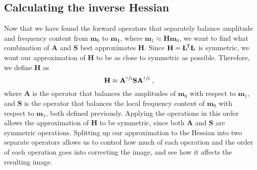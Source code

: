     \subsection{Calculating the inverse Hessian}
    Now that we have found the forward operators that separately balance amplitude and frequency content from $\mathbf{m}_0$ to $\mathbf{m_1}$, where $\mathbf{m}_1 \approx \mathbf{H} \mathbf{m}_0$, we want to find what combination of $\mathbf{A}$ and $\mathbf{S}$ best approximates $\mathbf{H}$.
    Since $\mathbf{H} = \mathbf{L}^{\mkern-1.5mu\mathsf{T}}\mathbf{L}$ is symmetric, we want our approximation of $\mathbf{H}$ to be as close to symmetric as possible.
    Therefore, we define $\mathbf{H}$ as
    \begin{equation}
            \mathbf{H} \approx \mathbf{A}^{\sfrac{1}{2}}\mathbf{S}\mathbf{A}^{\sfrac{1}{2}} \;,
    \end{equation}
    where $\mathbf{A}$ is the operator that balances the amplitudes of $\mathbf{m}_0$ with respect to $\mathbf{m}_1$, and $\mathbf{S}$ is the operator that balances the local frequency content of $\mathbf{m}_0$ with respect to $\mathbf{m}_1$, both defined previously.
    Applying the operations in this order allows the approximation of $\mathbf{H}$ to be symmetric, since both $\mathbf{A}$ and $\mathbf{S}$ are symmetric operations. 
    Splitting up our approximation to the Hessian into two separate operators allows us to control how much of each operation and the order of each operation goes into correcting the image, and see how it affects the resulting image.
